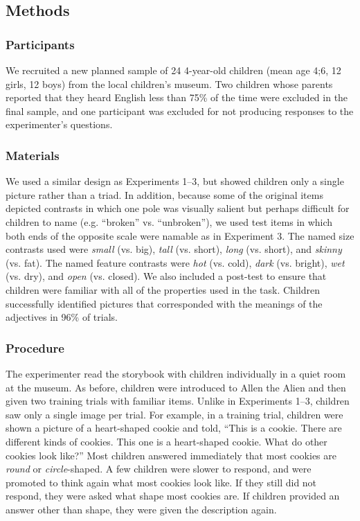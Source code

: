 \documentclass[man]{apa2}
\begin{document}
\subsection{Methods}

\subsubsection{Participants}

We recruited a new planned sample of 24 4-year-old children (mean age 4;6, 12 girls, 12 boys) from the local children's museum.  Two children whose parents reported that they heard English less than 75\% of the time were excluded in the final sample, and one participant was excluded for not producing responses to the experimenter's questions.

\subsubsection{Materials}

We used a similar design as Experiments 1--3, but showed children only a single picture rather than a triad.  In addition, because some of the original items depicted contrasts in which one pole was visually salient but perhaps difficult for children to name (e.g. ``broken'' vs. ``unbroken''), we used test items in which both ends of the opposite scale were namable as in Experiment 3. The named size contrasts used were \emph{small} (vs. big), \emph{tall} (vs. short), \emph{long} (vs. short), and \emph{skinny} (vs. fat).  The named feature contrasts were \emph{hot} (vs. cold), \emph{dark} (vs. bright), \emph{wet} (vs. dry), and \emph{open} (vs. closed).  We also included a post-test to ensure that children were familiar with all of the properties used in the task.  Children successfully identified pictures that corresponded with the meanings of the adjectives in 96\% of trials.

\subsubsection{Procedure}

The experimenter read the storybook with children individually in a quiet room at the museum. As before, children were introduced to Allen the Alien and then given two training trials with familiar items. Unlike in  Experiments 1--3, children saw only a single image per trial. For example, in a training trial, children were shown a picture of a heart-shaped cookie and told, ``This is a cookie.  There are different kinds of cookies.  This one is a heart-shaped cookie.  What do other cookies look like?'' Most children answered immediately that most cookies are \emph{round} or \emph{circle}-shaped. A few children were slower to respond, and were promoted to think again what most cookies look like. If they still did not respond, they were asked what shape most cookies are.  If children provided an answer other than shape, they were given the description again.
\end{document}
